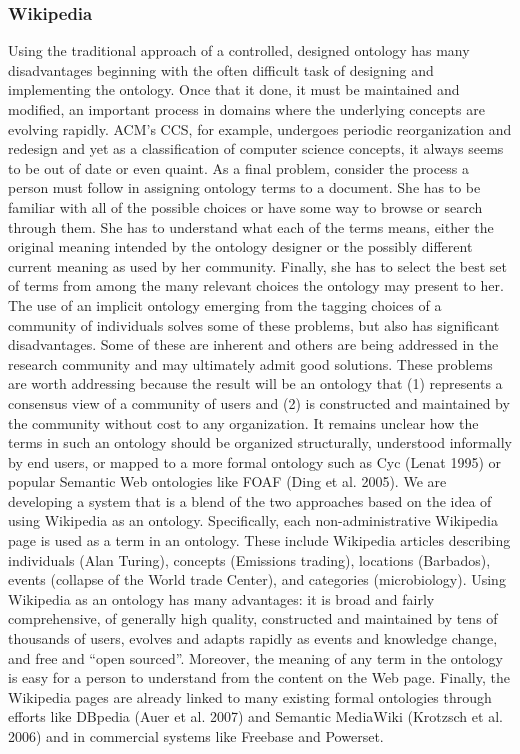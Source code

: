\subsubsection{Wikipedia}
Using the traditional approach of a controlled, designed ontology has many disadvantages beginning with the often difficult task of designing and implementing the ontology. Once that it done, it must be maintained and modified, an important process in domains where the underlying concepts are evolving rapidly. ACM’s CCS, for example, undergoes periodic reorganization and redesign and yet as a classification of computer science concepts, it always seems to be out of date or even quaint. As a final problem, consider the process a person must follow in assigning ontology terms to a document. She has to be familiar with all of the possible choices or have some way to browse or search through them. She has to understand what each of the terms means, either the original meaning intended by the ontology designer or the possibly different current meaning as used by her community. Finally, she has to select the best set of terms from among the many relevant choices the ontology may present to her. The use of an implicit ontology emerging from the tagging choices of a community of individuals solves some of these problems, but also has significant disadvantages\citep{wiki_1}.
Some of these are inherent and others are being addressed in the research community and may ultimately admit good solutions. These problems are worth addressing because the result will be an ontology that (1) represents a consensus view of a community of users and (2) is constructed and maintained by the community without cost to any organization. 
It remains unclear how the terms in such an ontology should be organized structurally, understood informally
by end users, or mapped to a more formal ontology such as Cyc (Lenat 1995) or popular Semantic Web
ontologies like FOAF (Ding et al. 2005). 
We are developing a system that is a blend of the two approaches based on the idea of using Wikipedia as an ontology. Specifically, each non-administrative Wikipedia page is used as a term in an ontology. These include Wikipedia articles describing individuals (Alan Turing), concepts (Emissions trading), locations (Barbados), events (collapse of the World trade Center), and categories (microbiology). 
Using Wikipedia as an ontology has many advantages: it is broad and fairly comprehensive, of generally high quality, constructed and maintained by tens of thousands of users, evolves and adapts rapidly as events and knowledge change, and free and “open sourced”. Moreover, the meaning of any term in the ontology is easy for a person to understand from the content on the Web page. Finally, the Wikipedia pages are already linked to many existing formal ontologies through efforts like DBpedia (Auer et al. 2007) and Semantic MediaWiki (Krotzsch et al. 2006) and in commercial systems like Freebase and Powerset.
